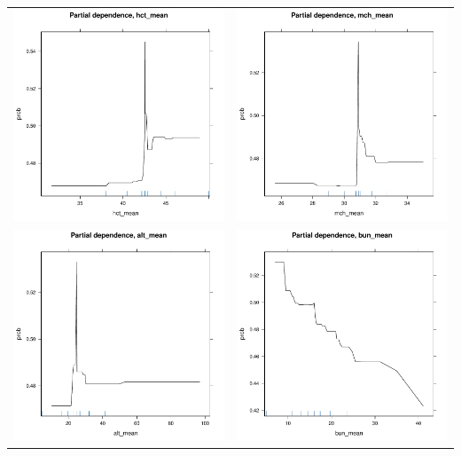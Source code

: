 \documentclass[12pt]{article}
\begin{document}
\begin{center}
\begin{tabular}{cc}
\includegraphics[width=.3\textwidth]{pdp_hct.pdf} &
\includegraphics[width=.3\textwidth]{pdp_mch.pdf} \\
\includegraphics[width=.3\textwidth]{pdp_alt.pdf} &
\includegraphics[width=.3\textwidth]{pdp_bun.pdf} \\
\end{tabular}
\end{center}
\end{document}

